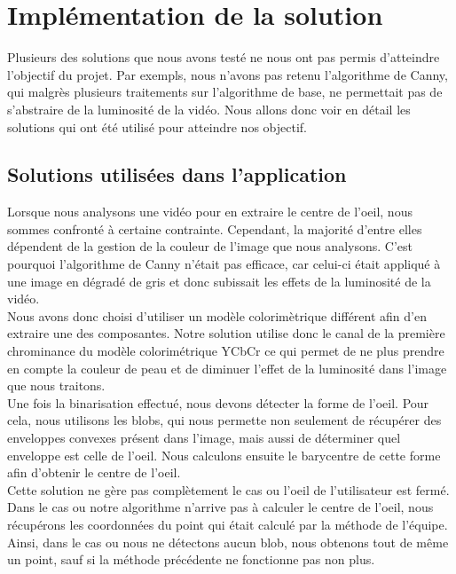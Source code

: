 \section{Implémentation de la solution}
Plusieurs des solutions que nous avons testé ne nous ont pas permis d'atteindre l'objectif du projet.
Par exempls, nous n'avons pas retenu l'algorithme de Canny, qui malgrès plusieurs traitements sur l'algorithme
de base, ne permettait pas de s'abstraire de la luminosité de la vidéo.
Nous allons donc voir en détail les solutions qui ont été utilisé pour atteindre nos objectif.

\subsection{Solutions utilisées dans l'application}
Lorsque nous analysons une vidéo pour en extraire le centre de l'oeil, nous sommes confronté à certaine contrainte.
Cependant, la majorité d'entre elles dépendent de la gestion de la couleur de l'image que nous analysons. C'est
pourquoi l'algorithme de Canny n'était pas efficace, car celui-ci était appliqué à une image en dégradé de gris
et donc subissait les effets de la luminosité de la vidéo.\\

Nous avons donc choisi d'utiliser un modèle colorimètrique différent afin d'en extraire une des composantes.
Notre solution utilise donc le canal de la première chrominance du modèle colorimétrique YCbCr ce qui permet 
de ne plus prendre en compte la couleur de peau et de diminuer l'effet de la luminosité dans l'image que nous traitons.\\


Une fois la binarisation effectué, nous devons détecter la forme de l'oeil. Pour cela, nous utilisons les blobs, qui nous
permette non seulement de récupérer des enveloppes convexes présent dans l'image, mais aussi de déterminer quel enveloppe
est celle de l'oeil. Nous calculons ensuite le barycentre de cette forme afin d'obtenir le centre de l'oeil.\\

Cette solution ne gère pas complètement le cas ou l'oeil de l'utilisateur est fermé. Dans le cas ou notre algorithme
n'arrive pas à calculer le centre de l'oeil, nous récupérons les coordonnées du point qui était calculé par la méthode 
de l'équipe. Ainsi, dans le cas ou nous ne détectons aucun blob, nous obtenons tout de même un point, sauf si la méthode 
précédente ne fonctionne pas non plus.


